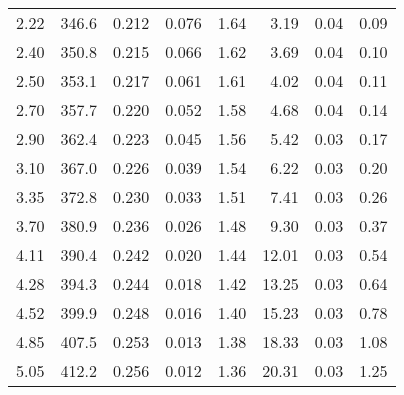 \begin{table}[h]
\begin{tabular}{rrrrrrrr}
2.22 & 346.6 & 0.212 & 0.076 &      1.64 &      3.19 &          0.04 &          0.09 \\
2.40 & 350.8 & 0.215 & 0.066 &      1.62 &      3.69 &          0.04 &          0.10 \\
2.50 & 353.1 & 0.217 & 0.061 &      1.61 &      4.02 &          0.04 &          0.11 \\
2.70 & 357.7 & 0.220 & 0.052 &      1.58 &      4.68 &          0.04 &          0.14 \\
2.90 & 362.4 & 0.223 & 0.045 &      1.56 &      5.42 &          0.03 &          0.17 \\
3.10 & 367.0 & 0.226 & 0.039 &      1.54 &      6.22 &          0.03 &          0.20 \\
3.35 & 372.8 & 0.230 & 0.033 &      1.51 &      7.41 &          0.03 &          0.26 \\
3.70 & 380.9 & 0.236 & 0.026 &      1.48 &      9.30 &          0.03 &          0.37 \\
4.11 & 390.4 & 0.242 & 0.020 &      1.44 &     12.01 &          0.03 &          0.54 \\
4.28 & 394.3 & 0.244 & 0.018 &      1.42 &     13.25 &          0.03 &          0.64 \\
4.52 & 399.9 & 0.248 & 0.016 &      1.40 &     15.23 &          0.03 &          0.78 \\
4.85 & 407.5 & 0.253 & 0.013 &      1.38 &     18.33 &          0.03 &          1.08 \\
5.05 & 412.2 & 0.256 & 0.012 &      1.36 &     20.31 &          0.03 &          1.25 \\
\bottomrule
\end{tabular}
\end{table}